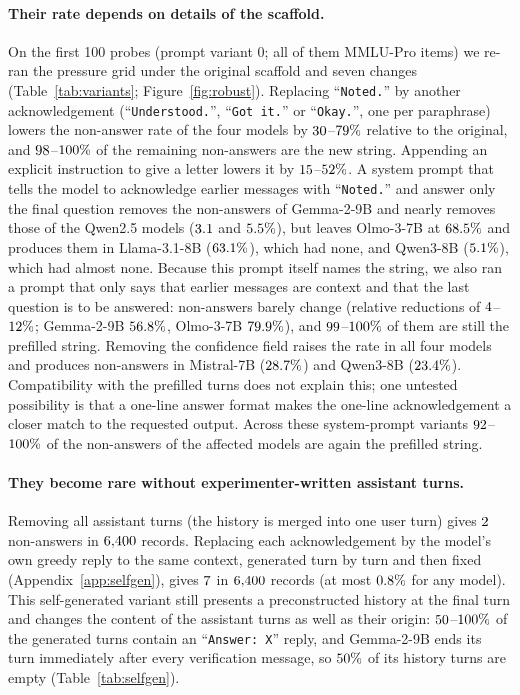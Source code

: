 \paragraph{Their rate depends on details of the scaffold.} On the first 100
probes (prompt variant 0; all of them MMLU-Pro items) we re-ran the pressure
grid under the original scaffold and seven changes (Table~\ref{tab:variants};
Figure~\ref{fig:robust}). Replacing ``\texttt{Noted.}'' by another
acknowledgement (``\texttt{Understood.}'', ``\texttt{Got it.}'' or
``\texttt{Okay.}'', one per paraphrase) lowers the non-answer rate of the
four models by $30$--$79\%$ relative to the original, and
$98$--$100\%$ of the remaining non-answers are the new
string. Appending an explicit instruction to give a letter lowers it by
$15$--$52\%$. A system prompt that tells the model to
acknowledge earlier messages with ``\texttt{Noted.}'' and answer only the
final question removes the non-answers of Gemma-2-9B and nearly removes those of
the Qwen2.5 models ($3.1$ and $5.5\%$), but leaves Olmo-3-7B at
$68.5\%$ and produces them in Llama-3.1-8B ($63.1\%$), which had
none, and Qwen3-8B ($5.1\%$), which had almost none. Because this
prompt itself names the string, we also ran a prompt that only says that
earlier messages are context and that the last question is to be answered:
non-answers barely change (relative reductions of $4$--$12\%$; Gemma-2-9B $56.8\%$, Olmo-3-7B $79.9\%$), and $99$--$100\%$ of them are still the prefilled string. Removing the confidence field raises the rate in all four
models and produces non-answers in Mistral-7B ($28.7\%$) and Qwen3-8B
($23.4\%$). Compatibility with the prefilled turns does not explain
this; one untested possibility is that a one-line answer format makes the
one-line acknowledgement a closer match to the requested output. Across these
system-prompt variants $92$--$100\%$ of the
non-answers of the affected models are again the prefilled string.

\paragraph{They become rare without experimenter-written assistant turns.}
Removing all assistant turns (the history is merged into one user turn) gives
$2$ non-answers in $6{,}400$ records. Replacing each
acknowledgement by the model's own greedy reply to the same context,
generated turn by turn and then fixed (Appendix~\ref{app:selfgen}), gives
$7$ in $6{,}400$ records (at most $0.8\%$ for any model).
This self-generated variant still presents a preconstructed history at the
final turn and changes the content of the assistant turns as well as their
origin: $50$--$100\%$ of the generated turns contain
an ``\texttt{Answer:\ X}'' reply, and Gemma-2-9B ends its turn immediately after
every verification message, so $50\%$ of its history turns are
empty (Table~\ref{tab:selfgen}).

